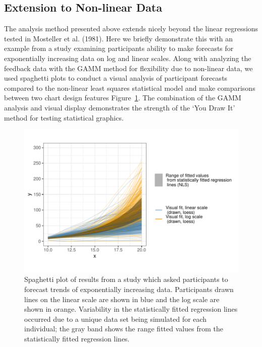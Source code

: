 \documentclass[
]{jds}
\begin{document}
\hypertarget{extension-to-non-linear-data}{%
\subsection{Extension to Non-linear
Data}\label{extension-to-non-linear-data}}

The analysis method presented above extends nicely beyond the linear
regressions tested in Mosteller et al. (1981). Here we briefly
demonstrate this with an example from a study examining participants
ability to make forecasts for exponentially increasing data on log and
linear scales. Along with analyzing the feedback data with the GAMM
method for flexibility due to non-linear data, we used spaghetti plots
to conduct a visual analysis of participant forecasts compared to the
non-linear least squares statistical model and make comparisons between
two chart design features Figure~\ref{fig-exponential-spaghetti-plot}.
The combination of the GAMM analysis and visual display demonstrates the
strength of the `You Draw It' method for testing statistical graphics.

\begin{figure}

{\centering \includegraphics{./images/fig-exponential-spaghetti-plot-1.pdf}

}

\caption{\label{fig-exponential-spaghetti-plot}Spaghetti plot of results
from a study which asked participants to forecast trends of
exponentially increasing data. Participants drawn lines on the linear
scale are shown in blue and the log scale are shown in orange.
Variability in the statistically fitted regression lines occurred due to
a unique data set being simulated for each individual; the gray band
shows the range fitted values from the statistically fitted regression
lines.}

\end{figure}
\end{document}
